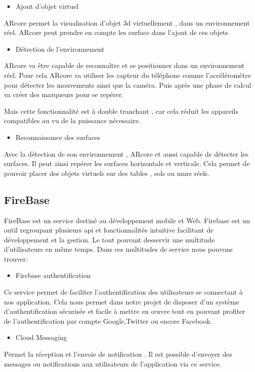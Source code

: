 \documentclass[12pt]{article}
\begin{document}
		\begin{itemize}
			\item Ajout d'objet virtuel
		\end{itemize}
		\par
		ARcore permet la visualisation d'objet 3d virtuellement , dans un environnement réel. ARcore peut prendre en compte les surface dans l'ajout de ces objets

		\begin{itemize}
			\item Détection de l'environnement
		\end{itemize}
		\par
		ARcore va être capable de reconnaître et se positionner dans un environnement réel. Pour cela ARcore va utiliser les capteur du téléphone comme l'accéléromètre pour détecter les mouvements ainsi que la caméra. Puis après une phase de calcul va créer des marqueurs pour se repérer.
		\par
		Mais cette fonctionnalité est à double tranchant , car cela réduit les appareils compatibles au vu de la puissance nécessaire.

		\begin{itemize}
			\item Reconnaissance des surfaces
		\end{itemize}
		\par
		Avec la détection de son environnement , ARcore et aussi capable de détecter les surfaces. Il peut ainsi repérer les surfaces horizontale et verticale. Cela permet de pouvoir placer des objets virtuels sur des tables , sols ou murs réels.
	\subsection{FireBase}
	\par
	FireBase est un service destiné au développement mobile et Web. Firebase est un outil regroupant plusieurs api et fonctionnalités intuitive facilitant de développement et la gestion. Le tout pouvant desservir une multitude d'utilisateurs en même temps. Dans ces multitudes de service nous pouvons trouver:
	\begin{itemize}
		\item Firebase authentification
	\end{itemize}
	\par
	Ce service permet de faciliter l'authentification des utilisateurs se connectant à nos application. Cela nous permet dans notre projet de disposer d'un système d'authentification sécurisée et facile à mettre en œuvre tout en pouvant profiter de l'authentification par compte Google,Twitter ou encore Facebook.
	\begin{itemize}
		\item Cloud Messaging
	\end{itemize}
	\par
	Permet la réception et l'envoie de notification . Il est possible d'envoyer des messages ou notifications aux utilisateurs de l'application via ce service.
\end{document}
